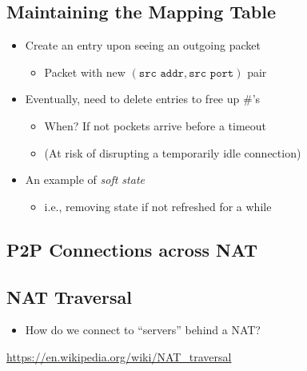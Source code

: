 \subsection{Maintaining the Mapping Table}
\begin{itemize}
    \item Create an entry upon seeing an outgoing packet
          \begin{itemize}
              \item Packet with new $(\texttt{src addr}, \texttt{src port})$ pair
          \end{itemize}
    \item Eventually, need to delete entries to free up \#'s
          \begin{itemize}
              \item When? If not pockets arrive before a timeout
              \item (At risk of disrupting a temporarily idle connection)
          \end{itemize}
    \item An example of \emph{soft state}
          \begin{itemize}
              \item i.e., removing state if not refreshed for a while
          \end{itemize}
\end{itemize}

\subsection{P2P Connections across NAT}
\begin{figure}[H]
\end{figure}

\subsection{NAT Traversal}
\begin{itemize}
    \item How do we connect to ``servers'' behind a NAT?
\end{itemize}
\url{https://en.wikipedia.org/wiki/NAT_traversal}

